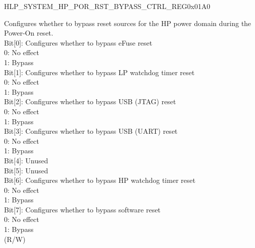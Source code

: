 \begin{register}{H}{LP\_SYSTEM\_HP\_POR\_RST\_BYPASS\_CTRL\_REG}{0x01A0}
\begin{regdesc}\begin{reglist}
\item [Continued from the previous page...]
\label{fielddesc:LPSYSTEMHPPORSTNBYPASSCTRL}\item [LP\_SYSTEM\_HP\_PO\_RSTN\_BYPASS\_CTRL] Configures whether to bypass reset sources for the HP power domain during the Power-On reset.\\
Bit[0]: Configures whether to bypass eFuse reset\\
0: No effect\\
1: Bypass\\
Bit[1]: Configures whether to bypass LP watchdog timer reset\\
0: No effect\\
1: Bypass\\
Bit[2]: Configures whether to bypass USB (JTAG) reset\\
0: No effect\\
1: Bypass\\
Bit[3]: Configures whether to bypass USB (UART) reset\\
0: No effect\\
1: Bypass\\
Bit[4]: Unused\\
Bit[5]: Unused\\
Bit[6]: Configures whether to bypass HP watchdog timer reset\\
0: No effect\\
1: Bypass\\
Bit[7]: Configures whether to bypass software reset\\
0: No effect\\
1: Bypass\\
(R/W)
\end{reglist}\end{regdesc}
\end{register}


